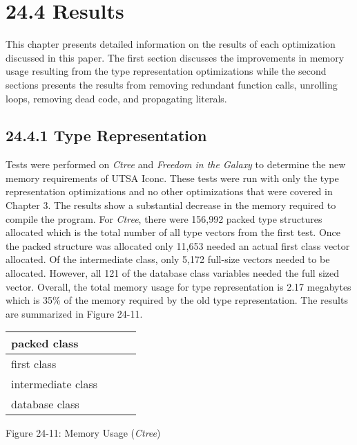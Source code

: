 \section[24.4 Results]{24.4 Results}

This chapter presents detailed information on the results of each
optimization discussed in this paper. The first section discusses the
improvements in memory usage resulting from the type representation
optimizations while the second sections presents the results from
removing redundant function calls, unrolling loops, removing dead
code, and propagating literals.

\subsection[24.4.1 Type Representation]{24.4.1 Type Representation}

Tests were performed on \textit{Ctree} and \textit{Freedom in the
Galaxy} to determine the new memory requirements of UTSA Iconc. These
tests were run with only the type representation optimizations and no
other optimizations that were covered in Chapter 3. The results show a
substantial decrease in the memory required to compile the
program. For \textit{Ctree}, there were 156,992 packed type structures
allocated which is the total number of all type vectors from the first
test. Once the packed structure was allocated only 11,653 needed an
actual first class vector allocated.  Of the intermediate class, only
5,172 full-size vectors needed to be allocated. However, all 121 of
the database class variables needed the full sized vector. Overall,
the total memory usage for type representation is 2.17 megabytes which
is 35\% of the memory required by the old type representation. The
results are summarized in Figure 24-11.

\begin{center}
\tabletail{}
\tablelasttail{}
\begin{supertabular}{|m{1.2163599in}|m{1.1969599in}|m{1.2538599in}|m{1.6636599in}|}
\hline
 packed class &
 &
 &
\raggedleft{}\\\hline
 first class &
 &
 &
\raggedleft{}\\\hline
 intermediate class &
 &
 &
\raggedleft{}\\\hline
 database class &
 &
 &
\raggedleft{}\\\hline
\end{supertabular}
\end{center}
{\centering{}
Figure 24-11: Memory Usage (\textit{Ctree})
\par}


